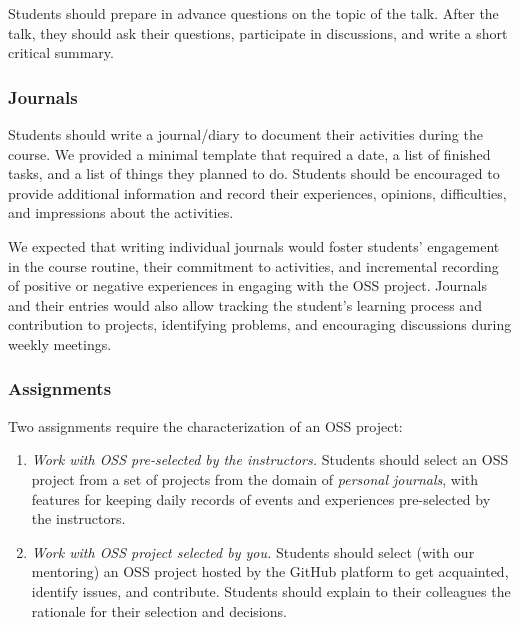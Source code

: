 \documentclass[sigconf]{acmart}
\begin{document}
Students should prepare in advance questions on the topic of the talk. 
After the talk, they should ask their questions, participate in discussions,
and write a short critical summary.

\subsubsection{Journals}

Students should write a journal/diary to document their activities during the course. We provided a minimal template that required a date,  a list of finished tasks, and a list of things they planned to do.
%
Students should be encouraged to provide additional information and record their experiences, opinions, difficulties, and impressions about the activities.

%
%
%
%

We expected that writing individual journals would foster students' engagement in the course routine, their commitment to activities, and incremental recording of positive or negative experiences in engaging with the OSS project.
Journals and their entries would also allow tracking the student's learning process and contribution to projects, identifying problems, and encouraging discussions during weekly meetings. 

\subsubsection{Assignments}


Two assignments require the characterization of an OSS project: 
\begin{enumerate}[label=\textbf{A\arabic*}]
    \item \textit{Work with OSS pre-selected by the instructors.}
    Students should select an OSS project from a set of projects from the domain of \textit{personal journals}, with features for keeping daily records of events and experiences pre-selected by the instructors.
    \item \textit{Work with OSS project selected by you.} 
    Students should select (with our mentoring) an OSS project hosted by the GitHub platform to get acquainted, identify issues, and contribute. Students should explain to their colleagues the rationale for their selection and decisions.
\end{enumerate}
\end{document}

